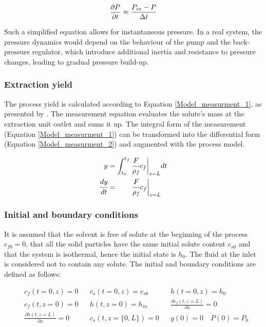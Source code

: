 \documentclass[a4paper,fleqn]{cas-dc}
\begin{document}
		{\footnotesize
			\begin{equation}
				\frac{\partial {\color{black}P}}{\partial t} \approx \frac{{\color{black}P_{in}} - {\color{black}P} }{\Delta t}
		\end{equation}}
		
		Such a simplified equation allows for instantaneous pressure. In a real system, the pressure dynamics would depend on the behaviour of the pump and the back-pressure regulator, which introduce additional inertia and resistance to pressure changes, leading to gradual pressure build-up.
		
		\subsubsection{Extraction yield} \label{CH: Yield}
		
		The process yield is calculated according to Equation \ref{Model_measurment_1}, as presented by \citet{Sovova1994a}. The measurement equation evaluates the solute's mass at the extraction unit outlet and sums it up. The integral form of the measurement (Equation \ref{Model_measurment_1}) can be transformed into the differential form (Equation \ref{Model_measurment_2}) and augmented with the process model.
		
		{\footnotesize
			\begin{align} 
				\label{Model_measurment_1}
				y &= \int_{t_0}^{t_f} \cfrac{F}{\rho_f} c_f \biggr\rvert_{z=L} dt \\
				\cfrac{dy}{dt} &= \qquad \cfrac{F}{\rho_f} c_f \biggr\rvert_{z=L} 
				\label{Model_measurment_2}
		\end{align}	}
		
		\subsubsection{Initial and boundary conditions} 
		It is assumed that the solvent is free of solute at the beginning of the process $c_{f0}=0$, that all the solid particles have the same initial solute content $c_{s0}$ and that the system is isothermal, hence the initial state is $h_0$. The fluid at the inlet is considered not to contain any solute. The initial and boundary conditions are defined as follows:
		
		{\footnotesize
			\begin{align*}
				&c_f(t = 0, z) = 0  && c_s(t = 0, z) = c_{s0} && h(t = 0, z) = h_0 \\
				&c_f(t,   z=0) = 0  && h(t, z=0) = h_{in}  && \frac{\partial c_f(t,z=L)}{\partial x} = 0 \\
				&\frac{\partial h(t,z=L)}{\partial x} = 0   && c_s(t, z=\{0,L\}) = 0 && y(0) = 0 \quad P(0) = P_0 \\
		\end{align*} }
		
\end{document}
